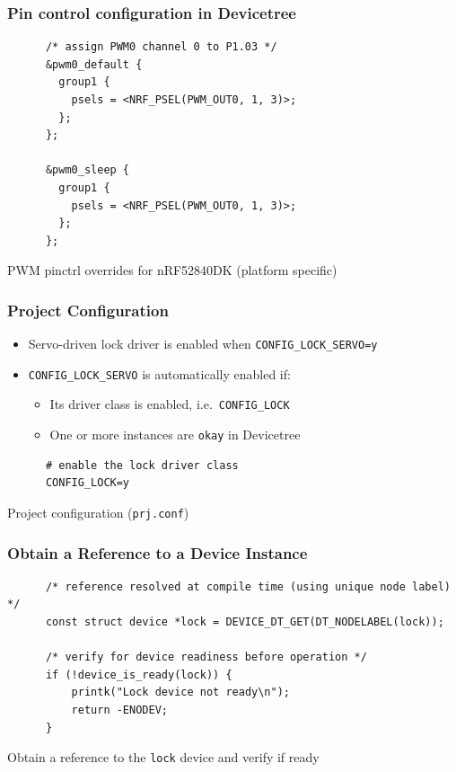 \documentclass[handout]{beamer}
\begin{document}
\begin{frame}[fragile]
  \frametitle{Pin control configuration in Devicetree}

  \begin{listing}[H]
    \begin{verbatim}
      /* assign PWM0 channel 0 to P1.03 */
      &pwm0_default {
        group1 {
          psels = <NRF_PSEL(PWM_OUT0, 1, 3)>;
        };
      };

      &pwm0_sleep {
        group1 {
          psels = <NRF_PSEL(PWM_OUT0, 1, 3)>;
        };
      };
    \end{verbatim}
    \caption{PWM pinctrl overrides for nRF52840DK (platform specific)}
  \end{listing}
\end{frame}

\begin{frame}[fragile]
  \frametitle{Project Configuration}

  \begin{itemize}
    \item Servo-driven lock driver is enabled when
          \texttt{CONFIG\_LOCK\_SERVO=y}
    \item \texttt{CONFIG\_LOCK\_SERVO} is automatically enabled if:
          \begin{itemize}
            \item Its driver class is enabled, i.e.\ \texttt{CONFIG\_LOCK}
            \item One or more instances are \texttt{okay} in Devicetree
          \end{itemize}
  \end{itemize}
  \begin{listing}[H]
    \begin{verbatim}
      # enable the lock driver class
      CONFIG_LOCK=y
    \end{verbatim}
    \caption{Project configuration (\texttt{prj.conf})}
  \end{listing}
\end{frame}

\begin{frame}[fragile]
  \frametitle{Obtain a Reference to a Device Instance}

  \begin{listing}[H]
    \begin{verbatim}
      /* reference resolved at compile time (using unique node label) */
      const struct device *lock = DEVICE_DT_GET(DT_NODELABEL(lock));

      /* verify for device readiness before operation */
      if (!device_is_ready(lock)) {
          printk("Lock device not ready\n");
          return -ENODEV;
      }
    \end{verbatim}
    \caption{Obtain a reference to the \texttt{lock} device and verify if ready}
  \end{listing}
\end{frame}
\end{document}
